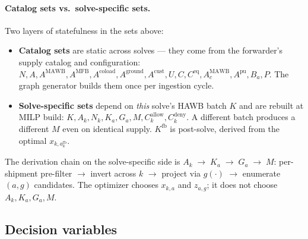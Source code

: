 \documentclass[11pt,a4paper]{article}
\theoremstyle{definition}
\begin{document}
\paragraph{Catalog sets vs.\ solve-specific sets.}
Two layers of statefulness in the sets above:
\begin{itemize}[noitemsep]
  \item \textbf{Catalog sets} are static across solves --- they come from
        the forwarder's supply catalog and configuration: $N, A, A^{\text{MAWB}},
        A^{\text{MFB}}, A^{\text{coload}}, A^{\text{ground}}, A^{\text{cust}},
        U, C, C^{\text{eq}}, A_c^{\text{MAWB}}, A^{\text{pu}}, B_a, P$. The
        graph generator builds them once per ingestion cycle.
  \item \textbf{Solve-specific sets} depend on \emph{this} solve's HAWB batch
        $K$ and are rebuilt at MILP build: $K, A_k, N_k, K_a, G_a, M,
        C_k^{\text{allow}}, C_k^{\text{deny}}$. A different
        batch produces a different $M$ even on identical supply. $K^{\text{fb}}$
        is post-solve, derived from the optimal $x_{k, a^{\text{fb}}_k}$.
\end{itemize}
The derivation chain on the solve-specific side is $A_k \;\to\; K_a \;\to\; G_a
\;\to\; M$: per-shipment pre-filter $\to$ invert across $k$ $\to$ project via
$g(\cdot)$ $\to$ enumerate $(a, g)$ candidates. The optimizer chooses
$x_{k,a}$ and $z_{a,g}$; it does not choose $A_k, K_a, G_a, M$.

\subsection*{Decision variables}
\end{document}
